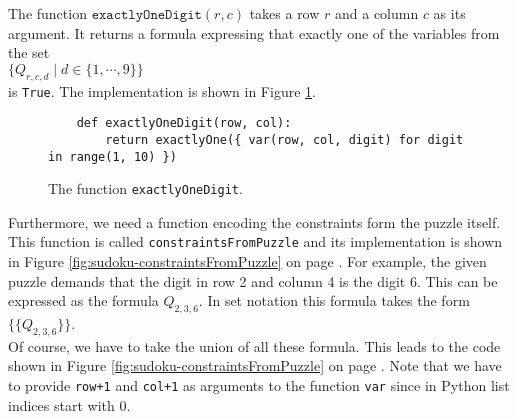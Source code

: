 The function $\texttt{exactlyOneDigit}(r, c)$ takes a row $r$ and a column $c$ as its argument.  It returns a
formula expressing that exactly one of the variables from the set
\\[0.2cm]
\hspace*{1.3cm}
$\bigl\{ Q_{r,c,d} \mid d \in \{1,\cdots, 9\} \bigr\}$
\\[0.2cm]
is \texttt{True}. The implementation is shown in Figure \ref{fig:sudoku-exactlyOneDigit}.

\begin{figure}[!ht]
\centering
\begin{verbatim}
    def exactlyOneDigit(row, col):
        return exactlyOne({ var(row, col, digit) for digit in range(1, 10) })
\end{verbatim}
\vspace*{-0.3cm}
\caption{The function \texttt{exactlyOneDigit}.}
\label{fig:sudoku-exactlyOneDigit}
\end{figure}


Furthermore, we need a function encoding the constraints form the puzzle itself.
This function is called \texttt{constraintsFromPuzzle} and its implementation is shown in Figure
\ref{fig:sudoku-constraintsFromPuzzle} on page \pageref{fig:sudoku-constraintsFromPuzzle}.
For example, the given puzzle demands that the digit in row 2 and column 4 is the digit $6$.
This can be expressed as the formula $Q_{2,3,6}$.  In set notation this formula takes the form
\\[0.2cm]
\hspace*{1.3cm}
$\bigl\{ \{Q_{2,3,6}\} \bigr\}$.
\\[0.2cm]
Of course, we have to take the union of all these formula.  This leads to the code shown in Figure
\ref{fig:sudoku-constraintsFromPuzzle} on page \pageref{fig:sudoku-constraintsFromPuzzle}.
Note that we have to provide \texttt{row+1} and \texttt{col+1} as arguments to the function \texttt{var} since
in Python list indices start with $0$.

